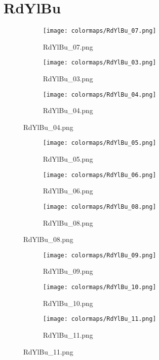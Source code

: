 \documentclass{article}%
\begin{document}
%
\newpage%
\section{RdYlBu}%
\label{sec:RdYlBu}%
\hspace{1cm}\hfill%
\hspace{1cm}\hfill%
\hspace{1cm}\hfill%


\begin{figure}[h!]%
\begin{subfigure}[b]{0.3\linewidth}%
\texttt{[image: colormaps/RdYlBu\_07.png]}%
\caption{RdYlBu\_07.png}%
\end{subfigure}%
\begin{subfigure}[b]{0.3\linewidth}%
\texttt{[image: colormaps/RdYlBu\_03.png]}%
\caption{RdYlBu\_03.png}%
\end{subfigure}%
\begin{subfigure}[b]{0.3\linewidth}%
\texttt{[image: colormaps/RdYlBu\_04.png]}%
\caption{RdYlBu\_04.png}%
\end{subfigure}%
\end{figure}

%
\hspace{1cm}\hfill%
\hspace{1cm}\hfill%
\hspace{1cm}\hfill%


\begin{figure}[h!]%
\begin{subfigure}[b]{0.3\linewidth}%
\texttt{[image: colormaps/RdYlBu\_05.png]}%
\caption{RdYlBu\_05.png}%
\end{subfigure}%
\begin{subfigure}[b]{0.3\linewidth}%
\texttt{[image: colormaps/RdYlBu\_06.png]}%
\caption{RdYlBu\_06.png}%
\end{subfigure}%
\begin{subfigure}[b]{0.3\linewidth}%
\texttt{[image: colormaps/RdYlBu\_08.png]}%
\caption{RdYlBu\_08.png}%
\end{subfigure}%
\end{figure}

%
\hspace{1cm}\hfill%
\hspace{1cm}\hfill%
\hspace{1cm}\hfill%


\begin{figure}[h!]%
\begin{subfigure}[b]{0.3\linewidth}%
\texttt{[image: colormaps/RdYlBu\_09.png]}%
\caption{RdYlBu\_09.png}%
\end{subfigure}%
\begin{subfigure}[b]{0.3\linewidth}%
\texttt{[image: colormaps/RdYlBu\_10.png]}%
\caption{RdYlBu\_10.png}%
\end{subfigure}%
\begin{subfigure}[b]{0.3\linewidth}%
\texttt{[image: colormaps/RdYlBu\_11.png]}%
\caption{RdYlBu\_11.png}%
\end{subfigure}%
\end{figure}
\end{document}
